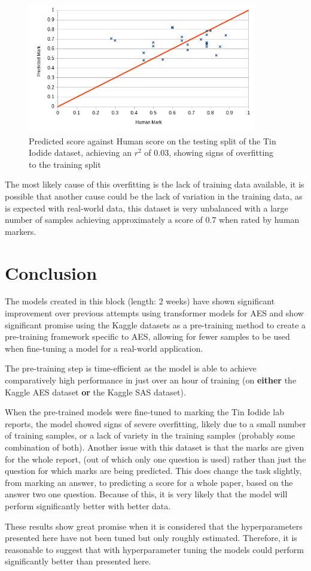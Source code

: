 \documentclass[11pt]{article}
\begin{document}
\begin{figure}[htbp]
\centering
\includegraphics[width=10cm]{./exp5_fine_dist.png}
\caption{Predicted score against Human score on the testing split of the Tin Iodide dataset, achieving an \(r^2\) of \(0.03\), showing signs of overfitting to the training split}
\end{figure}

The most likely cause of this overfitting is the lack of training data available, it is possible that another cause could be the lack of variation in the training data, as is expected with real-world data, this dataset is very unbalanced with a large number of samples achieving approximately a score of 0.7 when rated by human markers.

\newpage

\section{Conclusion}
\label{sec:org28ee607}
The models created in this block (length: 2 weeks) have shown significant improvement over previous attempts using transformer models for AES and show significant promise using the Kaggle datasets as a pre-training method to create a pre-training framework specific to AES, allowing for fewer samples to be used when fine-tuning a model for a real-world application.

The pre-training step is time-efficient as the model is able to achieve comparatively high performance in just over an hour of training (on \textbf{\textbf{either}} the Kaggle AES dataset \textbf{\textbf{or}} the Kaggle SAS dataset).

When the pre-trained models were fine-tuned to marking the Tin Iodide lab reports, the model showed signs of severe overfitting, likely due to a small number of training samples, or a lack of variety in the training samples (probably some combination of both). Another issue with this dataset is that the marks are given for the whole report, (out of which only one question is used) rather than just the question for which marks are being predicted. This does change the task slightly, from marking an answer, to predicting a score for a whole paper, based on the answer two one question. Because of this, it is very likely that the model will perform significantly better with better data.

These results show great promise when it is considered that the hyperparameters presented here have not been tuned but only roughly estimated. Therefore, it is reasonable to suggest that with hyperparameter tuning the models could perform significantly better than presented here.



\end{document}
